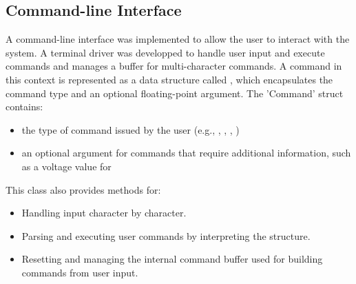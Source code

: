 \subsection{Command-line Interface}

A command-line interface was implemented to allow the user to interact with the system.
A terminal driver was developped to handle user input and execute commands and manages a 
buffer for multi-character commands. A command in this context is represented as a data 
structure called , which encapsulates the command type and an optional 
floating-point argument. The 'Command' struct contains:

\begin{itemize}
    \item the type of command issued by the user (e.g., , , , )
    \item an optional argument for commands that require additional information, such as a voltage value for 
\end{itemize}

This class also provides methods for:
\begin{itemize}
    \item Handling input character by character.
    \item Parsing and executing user commands by interpreting the  structure.
    \item Resetting and managing the internal command buffer used for building commands from user input.
\end{itemize}
